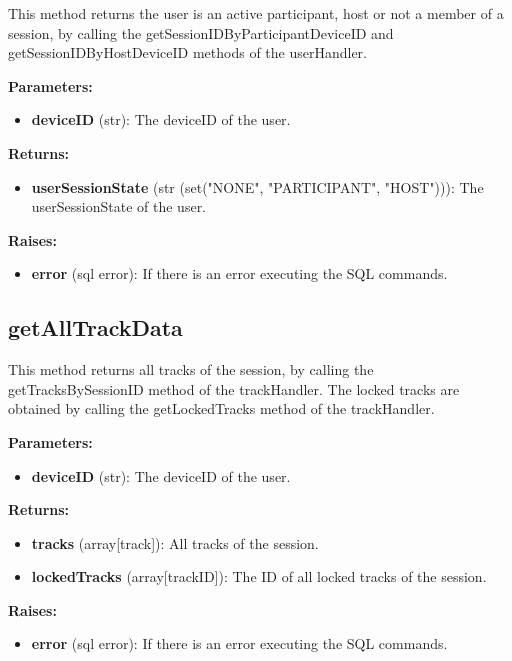 \documentclass[oneside, nenglish]{sdqtechreport}
\begin{document}
\begin{itemize}
This method returns the user is an active participant, host or not a member of a session, by calling the getSessionIDByParticipantDeviceID and getSessionIDByHostDeviceID methods of the userHandler.

\textbf{Parameters:}

\begin{itemize}
    \item \textbf{deviceID} (str): The deviceID of the user.
\end{itemize}

\textbf{Returns:}

\begin{itemize}
    \item \textbf{userSessionState} (str (set("NONE", "PARTICIPANT", "HOST"))): The userSessionState of the user.
\end{itemize}

\textbf{Raises:}

\begin{itemize}
    \item \textbf{error} (sql error): If there is an error executing the SQL commands.
\end{itemize}


\subsection{getAllTrackData}

This method returns all tracks of the session, by calling the getTracksBySessionID method of the trackHandler. The locked tracks are obtained by calling the getLockedTracks method of the trackHandler.

\textbf{Parameters:}

\begin{itemize}
    \item \textbf{deviceID} (str): The deviceID of the user.
\end{itemize}

\textbf{Returns:}

\begin{itemize}
    \item \textbf{tracks} (array[track]): All tracks of the session.
    \item \textbf{lockedTracks} (array[trackID]): The ID of all locked tracks of the session.
\end{itemize}

\textbf{Raises:}

\begin{itemize}
    \item \textbf{error} (sql error): If there is an error executing the SQL commands.
\end{itemize}



\end{itemize}
\end{document}
